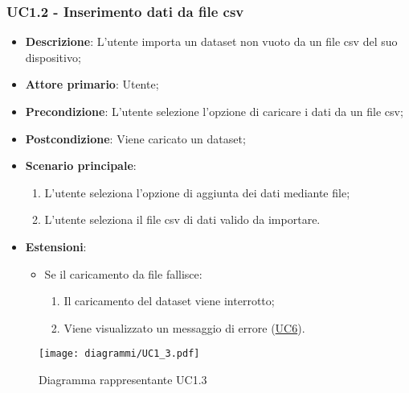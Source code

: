 \subsubsection{UC1.2 - Inserimento dati da file csv}
\label{ssub:uc1.2}
\begin{itemize}
    \item \textbf{Descrizione}: L'utente importa un dataset non vuoto da un file csv del suo dispositivo;

    \item \textbf{Attore primario}: Utente;
    
    \item \textbf{Precondizione}:   L'utente selezione l'opzione di caricare i dati da un file csv;
    \item \textbf{Postcondizione}:  Viene caricato un dataset;

	\item \textbf{Scenario principale}:
		\begin{enumerate}
			\item L'utente seleziona l'opzione di aggiunta dei dati mediante file;
			\item L'utente seleziona il file csv di dati valido da importare.
        \end{enumerate}

    \item \textbf{Estensioni}:
    \begin{itemize}
        \item Se il caricamento da file fallisce:
        \begin{enumerate}
            \item Il caricamento del dataset viene interrotto;
            \item Viene visualizzato un messaggio di errore (\hyperref[sub:uc6]{UC6}).
        \end{enumerate}
    \end{itemize}
\end{itemize}

\newpage
\begin{figure}[h]
    \centering
    \texttt{[image: diagrammi/UC1\_3.pdf]}
    \caption{Diagramma rappresentante UC1.3}
    \label{fig:UC1.3}
\end{figure}


